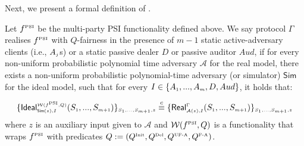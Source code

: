   
  
 
 Next, we present a formal definition of \p. %
 
\begin{definition}[\p]\label{def::PSI-Q-fair}
Let $f^{\scriptscriptstyle \text{PSI}}$ be the multi-party PSI functionality defined above. We say  protocol $\Gamma$ realises  $f^{\scriptscriptstyle \text{PSI}}$ with $Q$-fairness in the presence of $m-1$ static active-adversary clients (i.e., $A_{\scriptscriptstyle j}$s) or a static passive dealer $D$ or passive auditor $Aud$, if for every non-uniform probabilistic polynomial time adversary $\mathcal{A}$ for the real model, there exists a non-uniform probabilistic polynomial-time adversary (or simulator) $\mathsf{Sim}$ for the ideal model, such that for every $I\in \{A_{\scriptscriptstyle 1},...,A_{\scriptscriptstyle m}, D, Aud\}$, it holds that: 

\begin{equation*}
\{\mathsf {Ideal}^{\scriptscriptstyle \mathcal{W}(f^{\scriptscriptstyle \text{PSI}},Q)}_{\scriptscriptstyle \mathsf{Sim}(z), I}(S_{\scriptscriptstyle 1},..., S_{\scriptscriptstyle m+1})\}_{\scriptscriptstyle S_{\scriptscriptstyle 1},..., S_{\scriptscriptstyle m+1},z}\stackrel{c}{\equiv} \{\mathsf{Real}_{\scriptscriptstyle \mathcal{A}(z), I}^{\scriptscriptstyle \Gamma}(S_{\scriptscriptstyle 1},..., S_{\scriptscriptstyle m+1}) \}_{\scriptscriptstyle S_{\scriptscriptstyle 1},..., S_{\scriptscriptstyle m+1},z}
\end{equation*}
where  $z$ is an auxiliary input given to $\mathcal{A}$ and  $\mathcal{W}(f^{\scriptscriptstyle \text{PSI}},Q)$ is a functionality that wraps $f^{\scriptscriptstyle \text{PSI}}$ with predicates $Q:=(Q^{\scriptscriptstyle \text{Init}}, Q^{\scriptscriptstyle \text{Del}}, Q^{\scriptscriptstyle \text{UF-A}}, Q^{\scriptscriptstyle \text{F-A}})$. 
  \end{definition}
 
 
 
 
